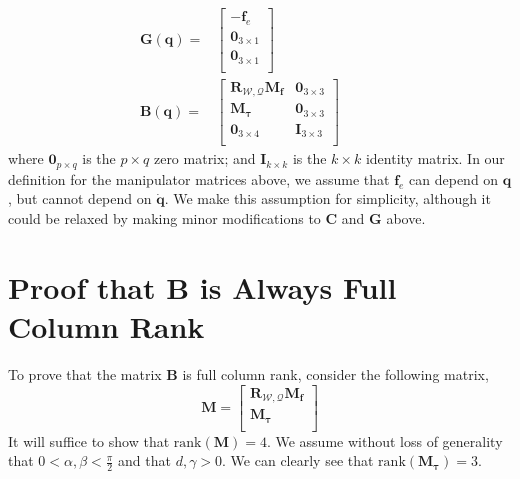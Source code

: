 %
\begin{equation}
\begin{aligned}
\mathbf{G}(\mathbf{q}) = &
\begin{bmatrix}
-\mathbf{f}_e \\
\mathbf{0}_{3\times1} \\
\mathbf{0}_{3\times1} \\
\end{bmatrix} \\
%
\mathbf{B}(\mathbf{q}) = &
\begin{bmatrix}
\mathbf{R}_{\mathcal{W},\mathcal{Q}} \mathbf{M}_{\mathbf{f}}  & \mathbf{0}_{3\times3} \\
\mathbf{M}_{\mathbf{\tau}}                                    & \mathbf{0}_{3\times3} \\
\mathbf{0}_{3\times4}                                         & \mathbf{I}_{3\times3} \\
\end{bmatrix} ~~~~~~~~~~~~~\text{}
\end{aligned}
\end{equation}
%
\normalsize
where $\mathbf{0}_{p \times q}$ is the $p \times q$ zero matrix;
and $\mathbf{I}_{k \times k}$ is the $k \times k$ identity matrix.
In our definition for the manipulator matrices above, we assume that $\mathbf{f}_e$ can depend on $\mathbf{q}$, but cannot depend on $\dot{\mathbf{q}}$.
We make this assumption for simplicity, although it could be relaxed by making minor modifications to $\mathbf{C}$ and $\mathbf{G}$ above.

\section{Proof that B is Always Full Column Rank}

To prove that the matrix $\mathbf{B}$ is full column rank, consider the following matrix,
%
\begin{equation}
\mathbf{M} = 
\begin{bmatrix}
\mathbf{R}_{\mathcal{W},\mathcal{Q}} \mathbf{M}_{\mathbf{f}} \\
\mathbf{M}_{\mathbf{\tau}}                                   \\
\end{bmatrix}
\end{equation}
%
It will suffice to show that $\mathrm{rank}(\mathbf{M})=4$.
We assume without loss of generality that $0 < \alpha,\beta < \frac{\pi}{2}$ and that $d,\gamma > 0$.
We can clearly see that $\mathrm{rank}(\mathbf{M}_{\mathbf{\tau}})=3$.

